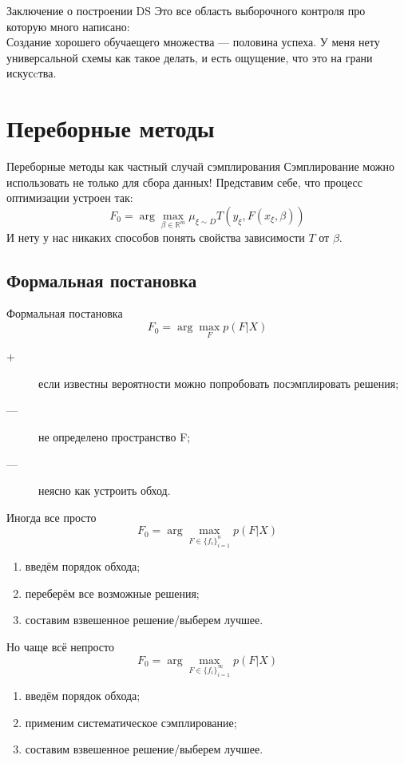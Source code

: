 \documentclass[14pt, fleqn, xcolor={dvipsnames, table}]{beamer}
\begin{document}
\begin{frame}{Заключение о построении DS}
Это все область выборочного контроля про которую много написано:\\

Создание хорошего обучаещего множества --- половина успеха. У меня нету универсальной схемы как такое делать, и есть ощущение, что это на грани искусcтва.
\end{frame}

\section{Переборные методы}

\begin{frame}{Переборные методы как частный случай сэмплирования}
Сэмплирование можно использовать не только для сбора данных! Представим себе, что процесс оптимизации устроен так:
$$
F_0 = \arg \max_{\beta \in \mathbb{R}^m} \mu_{\xi \sim D} T(y_{\xi}, F(x_{\xi}, \beta))
$$
И нету у нас никаких способов понять свойства зависимости $T$ от $\beta$.
\end{frame}

\subsection{Формальная постановка}
\begin{frame}{Формальная постановка}
$$
F_0 = \arg\max_F p(F|X)
$$
\begin{description}
  \item[\color{green}+] если известны вероятности можно попробовать посэмплировать решения;
  \item[\color{red}---] не определено пространство F;
  \item[\color{red}---] неясно как устроить обход.
\end{description}
\end{frame}

\begin{frame}{Иногда все просто}
$$
F_0 = \arg\max_{F \in \{f_i\}_{i=1}^n} p(F|X)
$$
\begin{enumerate}
  \item введём порядок обхода;
  \item переберём все возможные решения;
  \item составим взвешенное решение/выберем лучшее.
\end{enumerate}
\end{frame}

\begin{frame}{Но чаще всё непросто}
$$
F_0 = \arg\max_{F \in \{f_i\}_{i=1}^\infty} p(F|X)
$$
\begin{enumerate}
  \item введём порядок обхода;
  \item применим систематическое сэмплирование;
  \item составим взвешенное решение/выберем лучшее.
\end{enumerate}
\end{frame}
\end{document}
